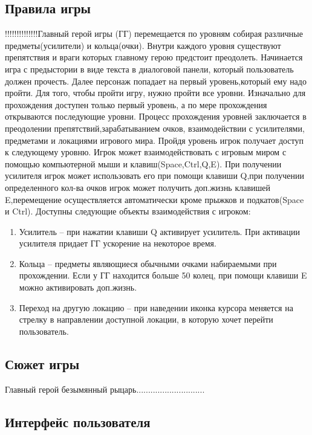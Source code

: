 \subsection{Правила игры}
!!!!!!!!!!!!!!Главный герой игры (ГГ) перемещается по уровням собирая различные предметы(усилители) и кольца(очки). Внутри каждого уровня существуют препятствия и враги которых главному герою предстоит преодолеть. Начинается игра с предыстории в виде текста в диалоговой панели, который пользователь должен прочесть. Далее персонаж попадает на первый уровень,который ему надо пройти. Для того, чтобы пройти игру, нужно пройти все уровни. Изначально для прохождения доступен только первый уровень, а по мере прохождения открываются последующие уровни. 
Процесс прохождения уровней заключается в преодолении препятствий,зарабатыванием очков, взаимодействии с усилителями, предметами и локациями игрового мира. Пройдя уровень игрок получает доступ к следующему уровню. Игрок может взаимодействовать с игровым миром с помощью компьютерной мыши и клавиш(Space,Ctrl,Q,E). При получении усилителя игрок может использовать его при помощи клавиши Q,при получении определенного кол-ва очков игрок может получить доп.жизнь клавишей E,перемещение осуществляется автоматически кроме прыжков и подкатов(Space и Ctrl). Доступны следующие объекты взаимодействия с игроком:
\begin{enumerate}
\item Усилитель – при нажатии клавиши Q активирует усилитель. При активации усилителя  придает ГГ ускорение на некоторое время.
\item Кольца – предметы являющиеся обычными очками набираемыми при прохождении. Если у ГГ находится больше 50 колец, при помощи клавиши E можно активировать доп.жизнь.
\item Переход на другую локацию – при наведении иконка курсора меняется на стрелку в направлении доступной локации, в которую хочет перейти пользователь.
\end{enumerate}

\subsection{Сюжет игры}

Главный герой безымянный рыцарь.............................

\subsection{Интерфейс пользователя}

